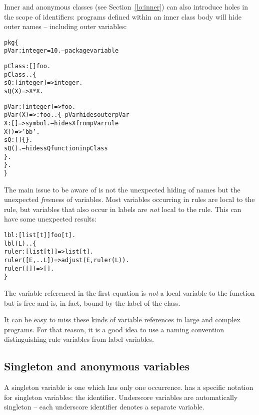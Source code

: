 Inner and anonymous classes (see Section~\vref{lo:inner}) can also introduce holes in the scope of identifiers: programs defined within an inner class body will hide outer names -- including outer variables:
\begin{alltt}
pkg\{
  pVar:integer = 10.               -- package variable
  
  pClass:[]\conarrow{}foo.
  pClass..\{
    sQ:[integer]=>integer.
    sQ(X) => X*X.
    
    pVar:[integer]=>foo.
    pVar(X) => :foo..\{    -- pVar hides outer pVar
      X:[]=>symbol.       -- hides X from pVar rule
      X()=>'bb'.
      sQ:[]\{\}.
      sQ().               -- hides sQ function in pClass
    \}.
  \}.
\}
\end{alltt}
\begin{aside}
The main issue to be aware of is not the unexpected hiding of names but the unexpected \emph{free}ness of variables. Most variables occurring in rules are local to the rule, but variables that also occur in labels are \emph{not} local to the rule. This can have some unexpected results:
\begin{alltt}
lbl:[list[t]]\conarrow{}foo[t].
lbl(L)..\{
  ruler:[list[t]]=>list[t].
  ruler([E,..L]) => adjust(E,ruler(L)).
  ruler([])=>[].
\}
\end{alltt}
The  variable referenced in the first  equation is \emph{not} a local variable to the  function but is free and is, in fact, bound by the  label of the class.

It can be easy to miss these kinds of variable references in large and complex programs. For that reason, it is a good idea to use a naming convention distinguishing rule variables from label variables.
\end{aside}

\subsection{Singleton and anonymous variables}
\label{expression:variable:anonymous}
A singleton variable is one which has only one occurrence. \go has a specific notation for singleton variables: the \q{\_} identifier. Underscore variables are automatically singleton -- each underscore identifier denotes a separate variable.

